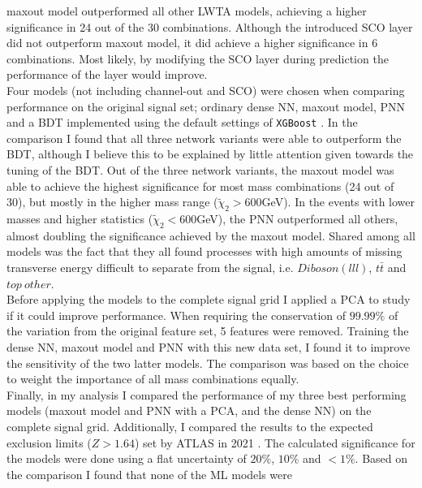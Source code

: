 maxout model outperformed all other \ac{LWTA} models, achieving a higher significance in 24 out of the 30 combinations. Although the introduced \ac{SCO} layer did not outperform maxout model, it did achieve a higher significance in 6 
combinations. Most likely, by modifying the \ac{SCO} layer during prediction the performance of the layer would improve.
\\\newline
Four models (not including channel-out and \ac{SCO}) were chosen when comparing performance on the original signal set; ordinary dense \ac{NN}, maxout model, \ac{PNN} and a \ac{BDT} implemented using the default settings of \verb!XGBoost! \cite{XGB}. In the comparison 
I found that all three network variants were able to outperform the \ac{BDT}, although I believe this to be explained by little attention given towards the tuning of the \ac{BDT}. Out of the three network variants, the maxout model was able to achieve 
the highest significance for most mass combinations (24 out of 30), but mostly in the higher mass range ($\tilde{\chi}_2>600$GeV). In the events with lower masses and higher statistics ($\tilde{\chi}_2<600$GeV), the \ac{PNN} outperformed all others, 
almost doubling the significance achieved by the maxout model. Shared among all models was the fact that they all found processes with high amounts of missing transverse energy difficult to separate from the signal, i.e. $Diboson(lll)$, $t\bar{t}$ and $top\ other$.
\\\newline
Before applying the models to the complete signal grid I applied a \ac{PCA} to study if it could improve performance. When requiring the conservation of $99.99\%$ of the variation from the original feature set, 5 features were removed.
Training the dense \ac{NN}, maxout model and \ac{PNN} with this new data set, I found it to improve the sensitivity of the two latter models. The comparison was based on the choice to weight the importance of all mass combinations equally.
\\\newline
Finally, in my analysis I compared the performance of my three best performing models (maxout model and \ac{PNN} with a \ac{PCA}, and the dense \ac{NN}) on the complete signal grid. Additionally, I compared the results to the expected exclusion 
limits ($Z>1.64$) set by \ac{ATLAS} in 2021 \cite{atlas_search_2021}. The calculated significance for the models were done using a flat uncertainty of $20\%$, $10\%$ and $<1\%$. Based on the comparison I found that none of the \ac{ML} models were 
